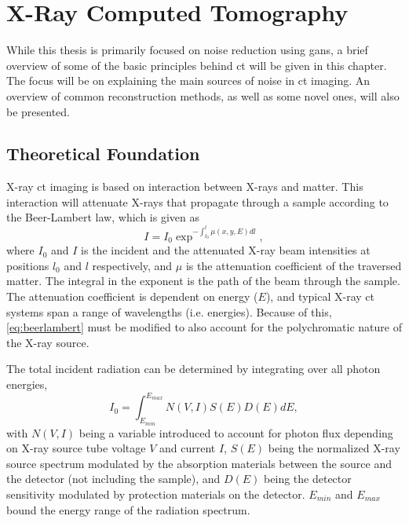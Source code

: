 \chapter{X-Ray Computed Tomography}
\label{sec:ct}
While this thesis is primarily focused on noise reduction using \acrshort{gan}s, a brief overview of some of the basic principles behind \acrfull{ct} will be given in this chapter. The focus will be on explaining the main sources of noise in \acrshort{ct} imaging. An overview of common reconstruction methods, as well as some novel ones, will also be presented.  


\section{Theoretical Foundation}
X-ray \acrshort{ct} imaging is based on interaction between X-rays and matter. This interaction will attenuate X-rays that propagate through a sample according to the Beer-Lambert law, which is given as \cite{doi:10.1063/1.4950807}
\begin{equation}
    \label{eq:beerlambert}
    I = I_0 \exp^{-\int_{l_0}^{l}\mu\left(x,y,E\right)dl},
\end{equation}
where $I_0$ and $I$ is the incident and the attenuated X-ray beam intensities at positions $l_0$ and $l$ respectively, and $\mu$ is the attenuation coefficient of the traversed matter. The integral in the exponent is the path of the beam through the sample. The attenuation coefficient is dependent on energy ($E$), and typical X-ray \acrshort{ct} systems span a range of wavelengths (i.e. energies). 
Because of this, \cref{eq:beerlambert} must be modified to also account for the polychromatic nature of the X-ray source. 

The total incident radiation can be determined by integrating over all photon energies, 
\begin{equation}
    \label{eq:incidentradiation}
    I_0 = \int_{E_{min}}^{E_{max}}N\left(V,I\right)S\left(E\right)D\left(E\right)dE,
\end{equation}
with $N\left(V,I\right)$ being a variable introduced to account for photon flux depending on X-ray source tube voltage $V$ and current $I$, $S\left(E\right)$ being the normalized X-ray source spectrum modulated by the absorption materials between the source and the detector (not including the sample), and $D\left(E\right)$ being the detector sensitivity modulated by protection materials on the detector. $E_{min}$ and $E_{max}$ bound the energy range of the radiation spectrum. 

